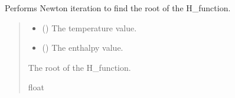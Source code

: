 \documentclass[a4paper,11pt,english,openany]{sphinxmanual}
\begin{document}
\begin{fulllineitems}
\label{\detokenize{api/spyice.update_physical_values:spyice.update_physical_values.H_newton_iteration}}
\pysigstartsignatures
{}
\pysigstopsignatures
\sphinxAtStartPar
Performs Newton iteration to find the root of the H\_function.
\begin{quote}\begin{description}
\begin{itemize}
\item {} 
\sphinxAtStartPar
{} () \textendash{} The temperature value.

\item {} 
\sphinxAtStartPar
{} () \textendash{} The enthalpy value.

\end{itemize}

\sphinxAtStartPar
The root of the H\_function.

\sphinxAtStartPar
float

\sphinxAtStartPar
{} \textendash{} 

\end{description}\end{quote}

\end{fulllineitems}

\end{document}
